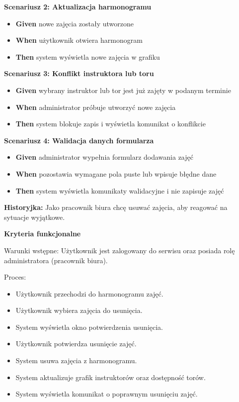 \documentclass[a4paper,12pt]{article}
\begin{document}
\textbf{Scenariusz 2: Aktualizacja harmonogramu}
\begin{itemize}
    \item \textbf{Given} nowe zajęcia zostały utworzone
    \item \textbf{When} użytkownik otwiera harmonogram
    \item \textbf{Then} system wyświetla nowe zajęcia w grafiku
\end{itemize}

\textbf{Scenariusz 3: Konflikt instruktora lub toru}
\begin{itemize}
    \item \textbf{Given} wybrany instruktor lub tor jest już zajęty w podanym terminie
    \item \textbf{When} administrator próbuje utworzyć nowe zajęcia
    \item \textbf{Then} system blokuje zapis i wyświetla komunikat o konflikcie
\end{itemize}

\textbf{Scenariusz 4: Walidacja danych formularza}
\begin{itemize}
    \item \textbf{Given} administrator wypełnia formularz dodawania zajęć
    \item \textbf{When} pozostawia wymagane pola puste lub wpisuje błędne dane
    \item \textbf{Then} system wyświetla komunikaty walidacyjne i nie zapisuje zajęć
\end{itemize}

\vspace{0,5cm}


\noindent \textbf{Historyjka:} Jako pracownik biura chcę usuwać zajęcia, aby reagować na sytuacje wyjątkowe.

\vspace{0,2cm}

\noindent \textbf{Kryteria funkcjonalne}

\vspace{0,2cm}

\noindent Warunki wstępne: Użytkownik jest zalogowany do serwisu oraz posiada rolę administratora (pracownik biura).

\vspace{0,2cm}

\noindent Proces:

\begin{itemize}
    \item Użytkownik przechodzi do harmonogramu zajęć.
    \item Użytkownik wybiera zajęcia do usunięcia.
    \item System wyświetla okno potwierdzenia usunięcia.
    \item Użytkownik potwierdza usunięcie zajęć.
    \item System usuwa zajęcia z harmonogramu.
    \item System aktualizuje grafik instruktorów oraz dostępność torów.
    \item System wyświetla komunikat o poprawnym usunięciu zajęć.
\end{itemize}
\end{document}
